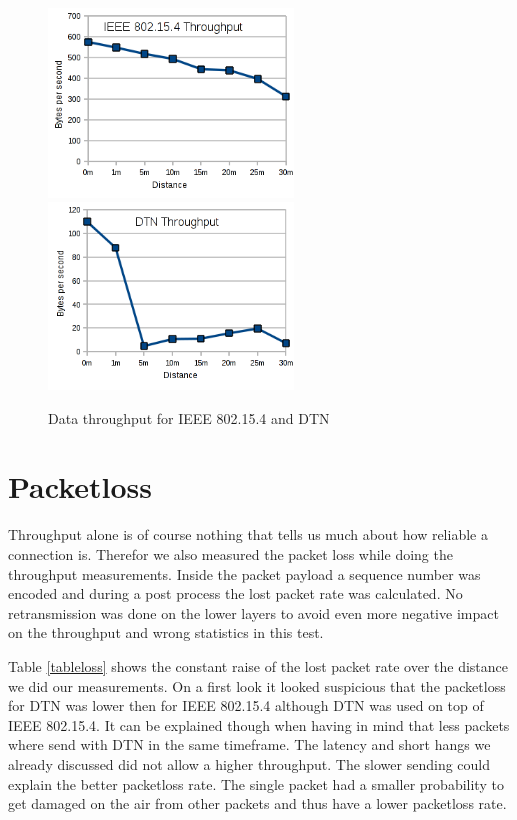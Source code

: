 \begin{figure}
  \begin{center}
    \includegraphics[width=6.5cm]{images/throughput_802154}
    \includegraphics[width=6.5cm]{images/throughput_dtn}
    \caption{Data throughput for IEEE 802.15.4 and DTN}
    \label{fig:throughput}
  \end{center}
\end{figure}

\section{Packetloss}
Throughput alone is of course nothing that tells us much about how reliable a
connection is. Therefor we also measured the packet loss while doing the
throughput measurements. Inside the packet payload a sequence number was encoded
and during a post process the lost packet rate was calculated. No retransmission
was done on the lower layers to avoid even more negative impact on the
throughput and wrong statistics in this test.

Table \ref{tableloss} shows the constant raise of the lost packet rate over the
distance we did our measurements. On a first look it looked suspicious that the
packetloss for DTN was lower then for IEEE 802.15.4 although DTN was used on top
of IEEE 802.15.4. It can be explained though when having in mind that less
packets where send with DTN in the same timeframe. The latency and short hangs
we already discussed did not allow a higher throughput. The slower sending could
explain the better packetloss rate. The single packet had a smaller probability
to get damaged on the air from other packets and thus have a lower packetloss
rate.

